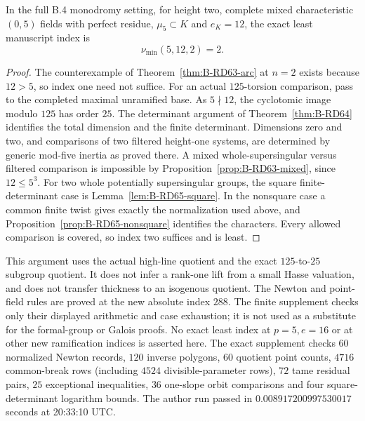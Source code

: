\begin{theorem}
\label{thm:B-RD65}
In the full B.4 monodromy setting, for height two, complete mixed
characteristic $(0,5)$ fields with perfect residue, $\mu_5\subset K$
and $e_K=12$, the exact least manuscript index is
\[
                           \nu_{\min}(5,12,2)=2.       \tag{B-RD65.8}
\]
\end{theorem}
\begin{proof}
The counterexample of Theorem~\ref{thm:B-RD63-arc} at $n=2$
exists because $12>5$, so index one need not suffice.
For an actual $125$-torsion comparison, pass to the completed
maximal unramified base. As $5\nmid12$, the cyclotomic image
modulo $125$ has order $25$. The determinant argument of
Theorem~\ref{thm:B-RD64} identifies the total dimension and the
finite determinant. Dimensions zero and two, and comparisons of
two filtered height-one systems, are determined by generic
mod-five inertia as proved there. A mixed whole-supersingular
versus filtered comparison is impossible by
Proposition~\ref{prop:B-RD63-mixed}, since $12\le5^3$.
For two whole potentially supersingular groups, the square
finite-determinant case is Lemma~\ref{lem:B-RD65-square}.
In the nonsquare case a common finite twist gives exactly the
normalization used above, and Proposition~\ref{prop:B-RD65-nonsquare}
identifies the characters. Every allowed comparison is covered,
so index two suffices and is least.
\end{proof}

\begin{remark}
\label{rem:B-RD65-scope}
This argument uses the actual high-line quotient and the exact
$125$-to-$25$ subgroup quotient. It does not infer a rank-one lift
from a small Hasse valuation, and does not transfer thickness to
an isogenous quotient. The Newton and point-field rules are proved
at the new absolute index $288$. The finite supplement checks
only their displayed arithmetic and case exhaustion; it is not
used as a substitute for the formal-group or Galois proofs.
No exact least index at $p=5,e=16$ or at other new ramification
indices is asserted here.
The exact supplement
checks $60$ normalized Newton records, $120$ inverse polygons,
$60$ quotient point counts, $4716$ common-break rows (including
$4524$ divisible-parameter rows), $72$ tame residual pairs,
$25$ exceptional inequalities, $36$ one-slope orbit comparisons
and four square-determinant logarithm bounds. The author run passed
in $0.008917200997530017$ seconds at 20:33:10 UTC.
\end{remark}
